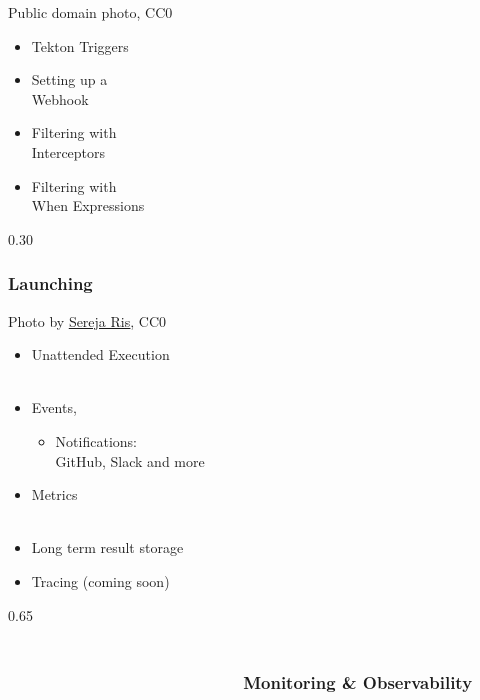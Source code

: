 \documentclass[aspectratio=169,11pt,hyperref={colorlinks=true}]{beamer}
\begin{document}
\begin{lgrayframerpic}{Public domain photo, CC0}%
  {%
  \begin{itemize}
    \item Tekton Triggers
    \item Setting up a\\Webhook
    \item Filtering with\\Interceptors
    \item Filtering with\\When Expressions
  \end{itemize}
  }%
  {0.30}
  \frametitle{Launching}
\end{lgrayframerpic}


\begin{lpicrblack}{%
  Photo by \href{https://unsplash.com/@serejaris}{\underline{Sereja Ris}}, CC0
  }%
  {%
  \begin{itemize}
    \item Unattended Execution \\~
    \item Events, 
    \begin{itemize}
      \item Notifications:\\GitHub, Slack and more
    \end{itemize}
    \item Metrics \\~
    \item Long term result storage
    \item Tracing (coming soon)
  \end{itemize}
  }%
  {0.65}%
  \frametitle{~~~~~~~~~~~~~~~~~~~~~~~~~~~~~~~~~~~~~~~~~~~~~~~~~~~~~~~~~~~~~~~~~~~~~~~~~~~~~~Monitoring \& Observability}
\end{lpicrblack}
\end{document}
